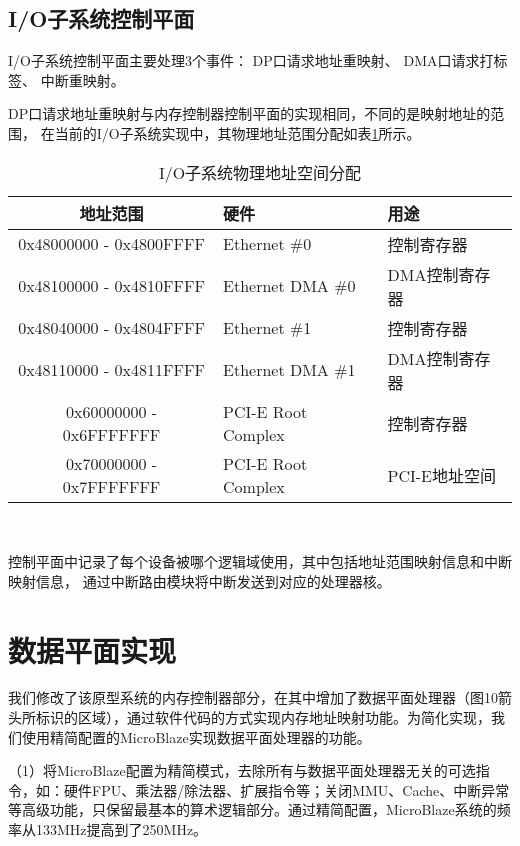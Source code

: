 \subsection{I/O子系统控制平面}
\label{chap:impl:iocp}

I/O子系统控制平面主要处理3个事件：
DP口请求地址重映射、
DMA口请求打标签、
中断重映射。

DP口请求地址重映射与内存控制器控制平面的实现相同，不同的是映射地址的范围，
在当前的I/O子系统实现中，其物理地址范围分配如表\ref{tab:pard-io-phyaddr}所示。

\begin{table}[htb]
  \centering
  \begin{minipage}[t]{0.8\linewidth}
  \caption{I/O子系统物理地址空间分配}
  \label{tab:pard-io-phyaddr}
    \begin{tabular*}{\linewidth}{cll}
      \toprule[1.5pt]
      \textbf{地址范围} & \textbf{硬件} & \textbf{用途} \\
      \midrule[1pt]
      0x48000000 - 0x4800FFFF & Ethernet \#0       & 控制寄存器    \\
      0x48100000 - 0x4810FFFF & Ethernet DMA \#0   & DMA控制寄存器 \\
      0x48040000 - 0x4804FFFF & Ethernet \#1       & 控制寄存器    \\
      0x48110000 - 0x4811FFFF & Ethernet DMA \#1   & DMA控制寄存器 \\
      0x60000000 - 0x6FFFFFFF & PCI-E Root Complex & 控制寄存器    \\
      0x70000000 - 0x7FFFFFFF & PCI-E Root Complex & PCI-E地址空间 \\
      \bottomrule[1.5pt]
    \end{tabular*}\\[2pt]
  \end{minipage}
\end{table}

控制平面中记录了每个设备被哪个逻辑域使用，其中包括地址范围映射信息和中断映射信息，
通过中断路由模块将中断发送到对应的处理器核。


\section{数据平面实现}

我们修改了该原型系统的内存控制器部分，在其中增加了数据平面处理器（图10箭头所标识的区域），通过软件代码的方式实现内存地址映射功能。为简化实现，我们使用精简配置的MicroBlaze实现数据平面处理器的功能。

（1）将MicroBlaze配置为精简模式，去除所有与数据平面处理器无关的可选指令，如：硬件FPU、乘法器/除法器、扩展指令等；关闭MMU、Cache、中断异常等高级功能，只保留最基本的算术逻辑部分。通过精简配置，MicroBlaze系统的频率从133MHz提高到了250MHz。

